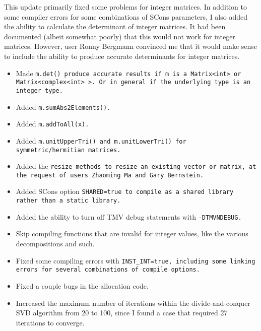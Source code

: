 \begin{description}
This update primarily fixed some problems for integer matrices.  In addition to some compiler
errors for some combinations of SCons parameters, I also added the ability to calculate the 
determinant of integer matrices.  It had been documented (albeit somewhat poorly) that 
this would not work for integer matrices.  However, user Ronny Bergmann convinced me that
it would make sense to include the ability to produce accurate determinants for integer matrices.

\begin{itemize}

\item 
Made \tt{m.det()} produce accurate results if \tt{m} is a \tt{Matrix<int>} or 
\tt{Matrix<complex<int> >}.  Or in general if the underlying type is an integer type.

\item 
Added \tt{m.sumAbs2Elements()}.

\item 
Added \tt{m.addToAll(x)}.

\item 
Added \tt{m.unitUpperTri()} and \tt{m.unitLowerTri()} for symmetric/hermitian matrices.

\item 
Added the \tt{resize} methods to resize an existing vector or matrix, at the request of users Zhaoming Ma and Gary Bernstein.  

\item 
Added SCons option \tt{SHARED=true} to compile as a shared library rather than a static library.

\item 
Added the ability to turn off TMV debug statements with \tt{-DTMVNDEBUG}.

\item 
Skip compiling functions that are invalid for integer values, like the various decompositions 
and such.  

\item 
Fixed some compiling errors with \tt{INST_INT=true}, including some linking errors 
for several combinations of compile options.

\item 
Fixed a couple bugs in the allocation code.

\item 
Increased the maximum number of iterations within the divide-and-conquer SVD
algorithm from 20 to 100, since I found a case that required 27 iterations to converge.


\end{itemize}
\end{description}
